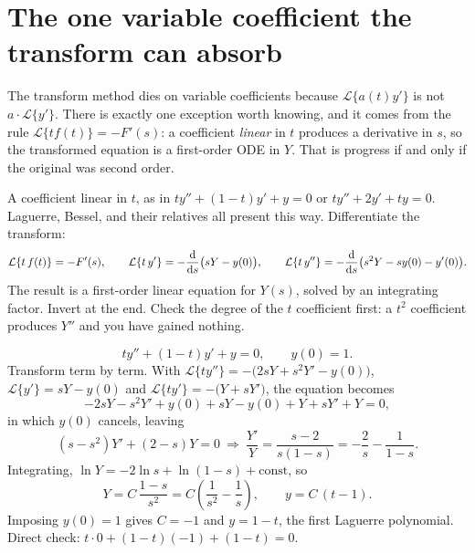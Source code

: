 \section{The one variable coefficient the transform can absorb}

The transform method dies on variable coefficients because $\mathcal{L}\{a(t)y'\}$ is not $a\cdot\mathcal{L}\{y'\}$. There is exactly one exception worth knowing, and it comes from the rule $\mathcal{L}\{tf(t)\}=-F'(s)$: a coefficient \emph{linear} in $t$ produces a derivative in $s$, so the transformed equation is a first-order ODE in $Y$. That is progress if and only if the original was second order.

\cue A coefficient linear in $t$, as in $ty''+(1-t)y'+y=0$ or $ty''+2y'+ty=0$. Laguerre, Bessel, and their relatives all present this way.
\method Differentiate the transform:
\[\mathcal{L}\{t\,f(t)\}=-F'(s),\qquad \mathcal{L}\{t\,y'\}=-\frac{\mathrm{d}}{\mathrm{d}s}\bigl(sY-y(0)\bigr),\qquad \mathcal{L}\{t\,y''\}=-\frac{\mathrm{d}}{\mathrm{d}s}\bigl(s^{2}Y-sy(0)-y'(0)\bigr).\]
The result is a first-order linear equation for $Y(s)$, solved by an integrating factor. Invert at the end. Check the degree of the $t$ coefficient first: a $t^{2}$ coefficient produces $Y''$ and you have gained nothing.

\begin{worked}
\[t y''+(1-t)y'+y=0,\qquad y(0)=1.\]
Transform term by term. With $\mathcal{L}\{ty''\}=-\bigl(2sY+s^{2}Y'-y(0)\bigr)$, $\mathcal{L}\{y'\}=sY-y(0)$ and $\mathcal{L}\{ty'\}=-\bigl(Y+sY'\bigr)$, the equation becomes
\[-2sY-s^{2}Y'+y(0)+sY-y(0)+Y+sY'+Y=0,\]
in which $y(0)$ cancels, leaving
\[(s-s^{2})Y'+(2-s)Y=0\ \Longrightarrow\ \frac{Y'}{Y}=\frac{s-2}{s(1-s)}=-\frac2s-\frac1{1-s}.\]
Integrating, $\ln Y=-2\ln s+\ln(1-s)+\text{const}$, so
\[Y=C\,\frac{1-s}{s^{2}}=C\left(\frac1{s^{2}}-\frac1s\right),\qquad y=C\,(t-1).\]
Imposing $y(0)=1$ gives $C=-1$ and $y=1-t$, the first Laguerre polynomial. Direct check: $t\cdot0+(1-t)(-1)+(1-t)=0$.
\end{worked}

